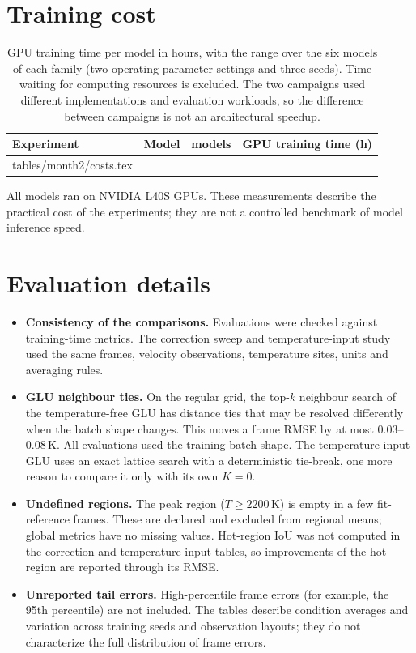 \documentclass[11pt,letterpaper]{article}
\makeatletter
\newcommand{\tabinput}[1]{\@@input #1 }
\newcommand{\K}{\,\mathrm{K}}
\makeatother
\begin{document}
\section{Training cost}
\label{app:costs}

\begin{table}[H]
\centering
\caption{GPU training time per model in hours, with the range over the six models of each family (two operating-parameter settings and three seeds). Time waiting for computing resources is excluded. The two campaigns used different implementations and evaluation workloads, so the difference between campaigns is not an architectural speedup.}
\label{tab:costs}
\small
\begin{tabular}{llrr}
\toprule
Experiment & Model & models & GPU training time (h) \\
\midrule
\tabinput{tables/month2/costs.tex}
\bottomrule
\end{tabular}
\end{table}

All models ran on NVIDIA L40S GPUs. These measurements describe the practical cost of the experiments; they are not a controlled benchmark of model inference speed.

\section{Evaluation details}
\label{app:notes}

\begin{itemize}
  \item \textbf{Consistency of the comparisons.} Evaluations were checked against training-time metrics. The correction sweep and temperature-input study used the same frames, velocity observations, temperature sites, units and averaging rules.
  \item \textbf{GLU neighbour ties.} On the regular grid, the top-$k$ neighbour search of the temperature-free GLU has distance ties that may be resolved differently when the batch shape changes. This moves a frame RMSE by at most $0.03$--$0.08\K$. All evaluations used the training batch shape. The temperature-input GLU uses an exact lattice search with a deterministic tie-break, one more reason to compare it only with its own $K{=}0$.
  \item \textbf{Undefined regions.} The peak region ($T\ge2200\K$) is empty in a few fit-reference frames. These are declared and excluded from regional means; global metrics have no missing values. Hot-region IoU was not computed in the correction and temperature-input tables, so improvements of the hot region are reported through its RMSE.
  \item \textbf{Unreported tail errors.} High-percentile frame errors (for example, the 95th percentile) are not included. The tables describe condition averages and variation across training seeds and observation layouts; they do not characterize the full distribution of frame errors.
\end{itemize}



\end{document}

